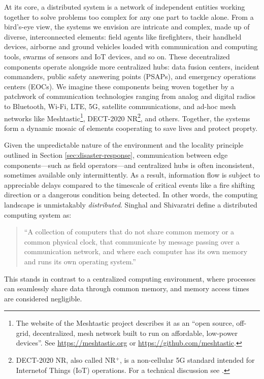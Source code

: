 \documentclass[]             %
{NASA}                       %
\theoremstyle{definition}
\begin{document}
At its core, a distributed system is a network of independent entities
working together to solve problems too complex for any one part to
tackle alone. From a bird’s-eye view, the systems we envision are
intricate and complex, made up of diverse, interconnected elements:
field agents like firefighters, their handheld devices, airborne and
ground vehicles loaded with communication and computing tools, swarms
of sensors and IoT devices, and so on. These decentralized components
operate alongside more centralized hubs: data fusion centers, incident
commanders, public safety answering points (PSAPs), and emergency
operations centers (EOCs). We imagine these components being woven
together by a patchwork of communication technologies ranging from
analog and digital radios to Bluetooth, Wi-Fi, LTE, 5G, satellite
communications, and ad-hoc mesh networks like
Meshtastic\footnote{The website of the
  Meshtastic project describes it as an ``open source, off-grid,
  decentralized, mesh network built to run on affordable, low-power
  devices''. See \url{https://meshtastic.org} or
  \url{https://github.com/meshtastic}.}, DECT-2020
NR\footnote{DECT-2020 NR, also called NR$^{+}$, is a non-cellular 5G
  standard intended for Internetof Things (IoT) operations. For a
  technical discussion see \cite{2022:dect-2020-nr}.}, and
others. Together, the systems form a dynamic mosaic of elements
cooperating to save lives and protect proprty.

Given the unpredictable nature of the environment and the locality
principle outlined in Section \ref{sec:disaster-response},
communication between edge components---such as field operators---and
centralized hubs is often inconsistent, sometimes available only
intermittently. As a result, information flow is subject to
appreciable delays compared to the timescale of critical events like a
fire shifting direction or a dangerous condition being detected. In
other words, the computing landscape is unmistakably
\emph{distributed}. Singhal and Shivaratri \cite{10.5555/562065}
define a distributed computing system as:
\begin{quote}
  ``A collection of computers that do not share common
  memory or a common physical clock, that communicate by message
  passing over a communication network, and where each computer has
  its own memory and runs its own operating system.''
\end{quote}
This stands in contrast to a centralized computing environment, where
processes can seamlessly share data through common memory, and memory
access times are considered negligible.
\end{document}
